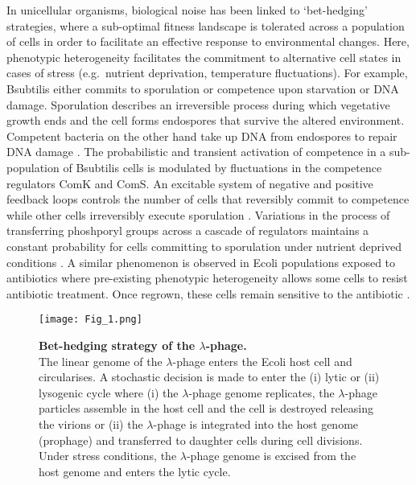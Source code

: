 In unicellular organisms, biological noise has been linked to ‘bet-hedging’ strategies, where a sub-optimal fitness landscape is tolerated across a population of cells in order to facilitate an effective response to environmental changes.
 Here, phenotypic heterogeneity facilitates the commitment to alternative cell states in cases of stress (e.g.~nutrient deprivation, temperature fluctuations). 
For example, \Gls{Bsubtilis} either commits to sporulation or competence upon starvation or DNA damage. 
Sporulation describes an irreversible process during which vegetative growth ends and the cell forms endospores that survive the altered environment. 
Competent bacteria on the other hand take up DNA from endospores to repair DNA damage \citep{Schultz2009}. 
The probabilistic and transient activation of competence in a sub-population of \Gls{Bsubtilis} cells is modulated by fluctuations in the competence regulators ComK and ComS. 
An excitable system of negative and positive feedback loops controls the number of cells that reversibly commit to competence while other cells irreversibly execute sporulation \citep{Suel2006}. 
Variations in the process of transferring phoshporyl groups across a cascade of regulators maintains a constant probability for cells committing to sporulation under nutrient deprived conditions \citep{Russell2017}. 
A similar phenomenon is observed in \Gls{Ecoli} populations exposed to antibiotics where pre-existing phenotypic heterogeneity allows some cells to resist antibiotic treatment. 
Once regrown, these cells remain sensitive to the antibiotic \citep{Balaban2004}. 

\begin{figure}[!h]
\centering
\texttt{[image: Fig\_1.png]}
\caption[Bet-hedging strategy of the $\lambda$-phage]{\textbf{Bet-hedging strategy of the $\lambda$-phage.}\\
The linear genome of the $\lambda$-phage enters the \Gls{Ecoli} host cell and circularises. 
A stochastic decision is made to enter the (i) lytic or (ii) lysogenic cycle where (i) the $\lambda$-phage genome replicates, the $\lambda$-phage particles assemble in the host cell and the cell is destroyed releasing the virions or (ii) the $\lambda$-phage is integrated into the host genome (prophage) and transferred to daughter cells during cell divisions. 
Under stress conditions, the $\lambda$-phage genome is excised from the host genome and enters the lytic cycle.}
\label{fig0:bedhedging}
\end{figure}

